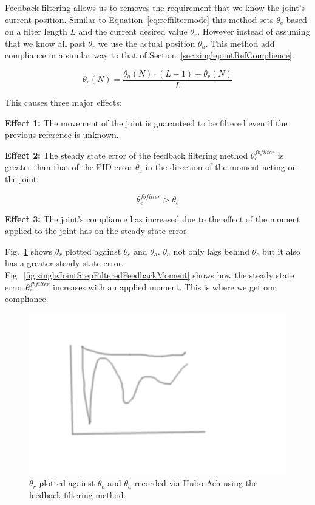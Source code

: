 Feedback filtering allows us to removes the requirement that we know the joint's current position.
Similar to Equation~\ref{eq:reffiltermode} this method sets $\theta_c$ based on a filter length $L$ and the current desired value $\theta_r$.
However instead of assuming that we know all past $\theta_r$ we use the actual position $\theta_a$.
This method add compliance in a similar way to that of Section~\ref{sec:singlejointRefComplience}.


\begin{equation}\label{eq:refencmode}
\theta_c(N) = \frac{\theta_a(N)\cdot\left(L-1\right) + \theta_r(N)}{L}
\end{equation}

This causes three major effects: 

\noindent \textbf{Effect 1:} The movement of the joint is guaranteed to be filtered even if the previous reference is unknown.

\noindent \textbf{Effect 2:} The steady state error of the feedback filtering method $\theta_e^{fbfilter}$ is greater than that of the PID error $\theta_e$ in the direction of the moment acting on the joint.

\begin{equation}
\theta_e^{fbfilter} > \theta_e
\end{equation}

\noindent \textbf{Effect 3:} The joint's compliance has increased due to the effect of the moment applied to the joint has on the steady state error.

Fig.~\ref{fig:singleJointStepFilteredFeedback} shows $\theta_r$ plotted against $\theta_c$ and $\theta_a$.  
$\theta_a$ not only lags behind $\theta_c$ but it also has a greater steady state error.
Fig.~\ref{fig:singleJointStepFilteredFeedbackMoment} shows how the steady state error $\theta_e^{fbfilter}$ increases with an applied moment.
This is where we get our compliance.

\begin{figure}[thpb]
  \centering
\includegraphics[width=0.8\columnwidth]{./pix/tmp.png}
  \caption{$\theta_r$ plotted against $\theta_c$ and $\theta_a$ recorded via Hubo-Ach using the feedback filtering method.}
  \label{fig:singleJointStepFilteredFeedback}
\end{figure}

